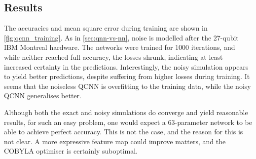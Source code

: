 \subsection{Results}
The accuracies and mean square error during training are shown in \cref{fig:qcnn_training}.
As in \cref{sec:qnn-vs-nn}, noise is modelled after the 27-qubit IBM Montreal hardware.
The networks were trained for 1000 iterations, and while neither reached full accuracy, the losses shrunk, indicating at least increased certainty in the predictions.
Interestingly, the noisy simulation appears to yield better predictions, despite suffering from higher losses during training.
It seems that the noiseless QCNN is overfitting to the training data, while the noisy QCNN generalises better.

Although both the exact and noisy simulations do converge and yield reasonable results, for such an easy problem, one would expect a 63-parameter network to be able to achieve perfect accuracy.
This is not the case, and the reason for this is not clear.
A more expressive feature map could improve matters, and the COBYLA optimiser is certainly suboptimal.

